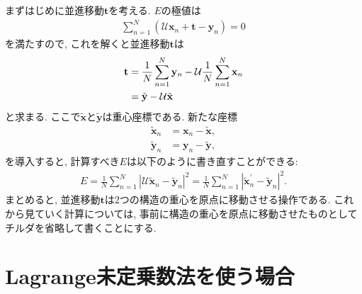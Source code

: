 まずはじめに並進移動$\mathbf{t}$を考える.
$E$の極値は
\begin{align}
 \sum_{n=1}^{N} (\mathcal{U}\mathbf{x}_{n} + \mathbf{t} - \mathbf{y}_{n}) = 0
\end{align}
を満たすので, これを解くと並進移動$\mathbf{t}$は
\begin{align}
  \mathbf{t} 
&=
  \frac{1}{N} \sum_{n=1}^{N} \mathbf{y}_{n} - \mathcal{U} \frac{1}{N} \sum_{n=1}^{N} \mathbf{x}_{n}
\notag \\
&= 
  \tilde{\mathbf{y}} - \mathcal{U} \tilde{\mathbf{x}}
\end{align}
と求まる. ここで$\tilde{\mathbf{x}}$と$\tilde{\mathbf{y}}$は重心座標である.
新たな座標
\begin{align}
 \tilde{\mathbf{x}}_{n} &= \mathbf{x}_{n} - \tilde{\mathbf{x}}, \\
 \tilde{\mathbf{y}}_{n} &= \mathbf{y}_{n} - \tilde{\mathbf{y}},
\end{align}
を導入すると, 計算すべき$E$は以下のように書き直すことができる:
\begin{align}
 E
 =
 \frac{1}{N}  \sum_{n=1}^{N} |\mathcal{U} \tilde{\mathbf{x}}_{n} -  \tilde{\mathbf{y}}_{n}|^{2}
 =
 \frac{1}{N}  \sum_{n=1}^{N} |\tilde{\mathbf{x}}_{n}^{\prime} -  \tilde{\mathbf{y}}_{n}|^{2}.
 \label{eq:mod_E}
\end{align}
まとめると, 並進移動$\mathbf{t}$は2つの構造の重心を原点に移動させる操作である.
これから見ていく計算については, 事前に構造の重心を原点に移動させたものとしてチルダを省略して書くことにする.


\section{Lagrange未定乗数法を使う場合\cite{1976Kabsch, 1978Kabsch}}
